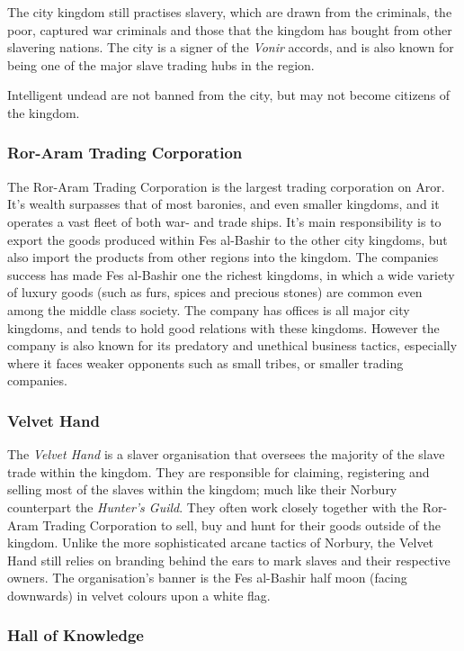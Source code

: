 The city kingdom still practises slavery, which are drawn from the criminals,
the poor, captured war criminals and those that the kingdom has bought from
other slavering nations. The city is a signer of the \emph{Vonir} accords, and
is also known for being one of the major slave trading hubs in the region.

Intelligent undead are not banned from the city, but may not become citizens
of the kingdom.

\subsubsection*{Ror-Aram Trading Corporation}

The Ror-Aram Trading Corporation is the largest trading corporation on Aror.
It's wealth surpasses that of most baronies, and even smaller kingdoms, and it
operates a vast fleet of both war- and trade ships. It's main responsibility is
to export the goods produced within Fes al-Bashir to the other city kingdoms,
but also import the products from other regions into the kingdom. The
companies success has made Fes al-Bashir one the richest kingdoms, in which a
wide variety of luxury goods (such as furs, spices and precious stones) are
common even among the middle class society. The company has offices is all
major city kingdoms, and tends to hold good relations with these
kingdoms. However the company is also known for its predatory and unethical
business tactics, especially where it faces weaker opponents such as small
tribes, or smaller trading companies.

\subsubsection*{Velvet Hand}

The \emph{Velvet Hand} is a slaver organisation that oversees the majority of
the slave trade within the kingdom. They are responsible for claiming,
registering and selling most of the slaves within the kingdom; much like their
Norbury counterpart the \emph{Hunter's Guild}. They often work closely
together with the Ror-Aram Trading Corporation to sell, buy and hunt for their
goods outside of the kingdom. Unlike the more sophisticated arcane tactics of
Norbury, the Velvet Hand still relies on branding behind the ears to mark
slaves and their respective owners. The organisation's banner is the Fes
al-Bashir half moon (facing downwards) in velvet colours upon a white flag.

\subsubsection*{Hall of Knowledge}

